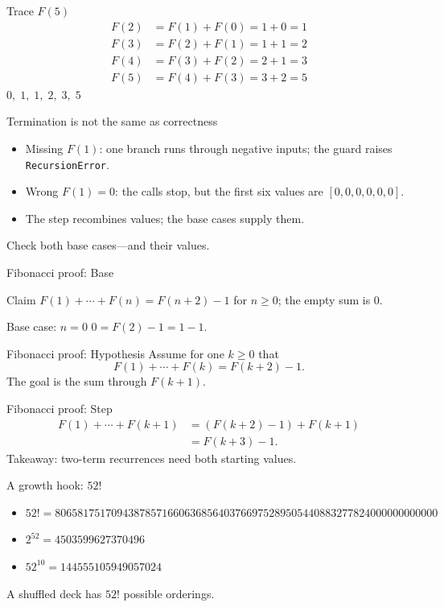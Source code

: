 \documentclass[aspectratio=169,10pt]{beamer}
\begin{document}
\begin{frame}{Trace $F(5)$}
  \begin{align*}
    F(2)&=F(1)+F(0)=1+0=1\\
    F(3)&=F(2)+F(1)=1+1=2\\
    F(4)&=F(3)+F(2)=2+1=3\\
    F(5)&=F(4)+F(3)=3+2=5
  \end{align*}
  \centering\large $0,\;1,\;1,\;2,\;3,\;5$
\end{frame}

\begin{frame}{Termination is not the same as correctness}
  \begin{itemize}
    \item Missing $F(1)$: one branch runs through negative inputs; the guard raises \texttt{RecursionError}.
    \item Wrong $F(1)=0$: the calls stop, but the first six values are $[0,0,0,0,0,0]$.
    \item The step recombines values; the base cases supply them.
  \end{itemize}
  \vfill\centering\Large Check both base cases---and their values.
\end{frame}

\begin{frame}{Fibonacci proof: Base}
  \begin{block}{Claim}
    $F(1)+\cdots+F(n)=F(n+2)-1$ for $n\ge 0$; the empty sum is $0$.
  \end{block}
  \begin{block}{Base case: $n=0$}
    $0=F(2)-1=1-1$.
  \end{block}
\end{frame}

\begin{frame}{Fibonacci proof: Hypothesis}
  Assume for one $k\ge0$ that
  \[
    F(1)+\cdots+F(k)=F(k+2)-1.
  \]
  The goal is the sum through $F(k+1)$.
\end{frame}

\begin{frame}{Fibonacci proof: Step}
  \begin{align*}
    F(1)+\cdots+F(k+1)
      &=(F(k+2)-1)+F(k+1)\\
      &=F(k+3)-1.
  \end{align*}
  \centering\Large Takeaway: two-term recurrences need both starting values.
\end{frame}

\begin{frame}{A growth hook: $52!$}
  \begin{itemize}
    \item $52!=80658175170943878571660636856403766975289505440883277824000000000000$
    \item $2^{52}=4503599627370496$
    \item $52^{10}=144555105949057024$
  \end{itemize}
  \vfill\centering\Large A shuffled deck has $52!$ possible orderings.
\end{frame}
\end{document}
